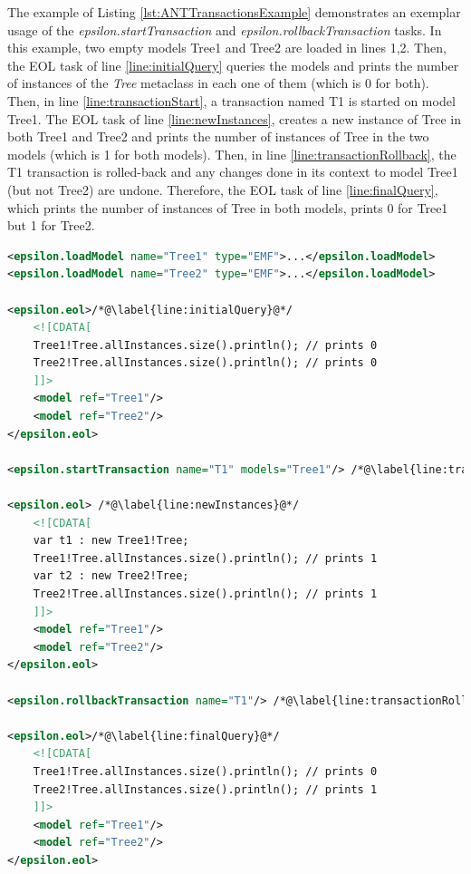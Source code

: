 The example of Listing \ref{lst:ANTTransactionsExample} demonstrates an exemplar usage of the \emph{epsilon.startTransaction} and \emph{epsilon.rollbackTransaction} tasks. In this example, two empty models Tree1 and Tree2 are loaded in lines 1,2. Then, the EOL task of line \ref{line:initialQuery} queries the models and prints the number of instances of the \emph{Tree} metaclass in each one of them (which is 0 for both). Then, in line \ref{line:transactionStart}, a transaction named T1 is started on model Tree1. The EOL task of line \ref{line:newInstances}, creates a new instance of Tree in both Tree1 and Tree2 and prints the number of instances of Tree in the two models (which is 1 for both models). Then, in line \ref{line:transactionRollback}, the T1 transaction is rolled-back and any changes done in its context to model Tree1 (but not Tree2) are undone. Therefore, the EOL task of line \ref{line:finalQuery}, which prints the number of instances of Tree in both models, prints 0 for Tree1 but 1 for Tree2.

\begin{lstlisting}[float=tbp, caption=Exemplar usage of the \emph{epsilon.startTransaction} and \emph{epsilon.rollbackTransaction} tasks, label=lst:ANTTransactionsExample, language=XML]
<epsilon.loadModel name="Tree1" type="EMF">...</epsilon.loadModel>
<epsilon.loadModel name="Tree2" type="EMF">...</epsilon.loadModel>

<epsilon.eol>/*@\label{line:initialQuery}@*/
	<![CDATA[
	Tree1!Tree.allInstances.size().println(); // prints 0 
	Tree2!Tree.allInstances.size().println(); // prints 0
	]]>
	<model ref="Tree1"/>
	<model ref="Tree2"/>
</epsilon.eol>

<epsilon.startTransaction name="T1" models="Tree1"/> /*@\label{line:transactionStart}@*/

<epsilon.eol> /*@\label{line:newInstances}@*/
	<![CDATA[
	var t1 : new Tree1!Tree; 
	Tree1!Tree.allInstances.size().println(); // prints 1
	var t2 : new Tree2!Tree;
	Tree2!Tree.allInstances.size().println(); // prints 1
	]]>
	<model ref="Tree1"/>
	<model ref="Tree2"/>
</epsilon.eol>

<epsilon.rollbackTransaction name="T1"/> /*@\label{line:transactionRollback}@*/

<epsilon.eol>/*@\label{line:finalQuery}@*/
	<![CDATA[
	Tree1!Tree.allInstances.size().println(); // prints 0 
	Tree2!Tree.allInstances.size().println(); // prints 1 
	]]>
	<model ref="Tree1"/>
	<model ref="Tree2"/>
</epsilon.eol>
\end{lstlisting}

